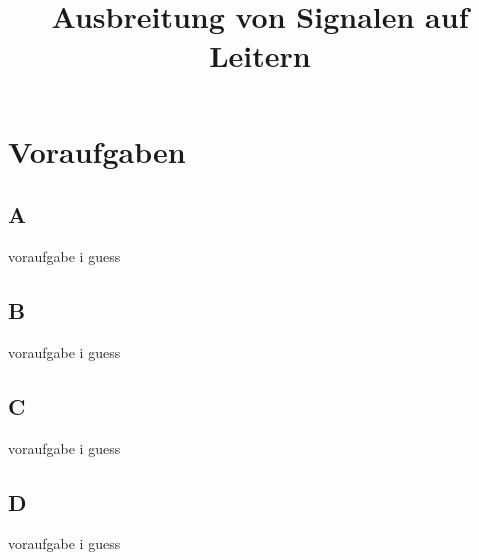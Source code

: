 

\title{Ausbreitung von Signalen auf Leitern}


\maketitle
\tableofcontents
\disclaimer

\chapter{Voraufgaben}
\section{A}
voraufgabe i guess

\section{B}
voraufgabe i guess

\section{C}
voraufgabe i guess

\section{D}
voraufgabe i guess



